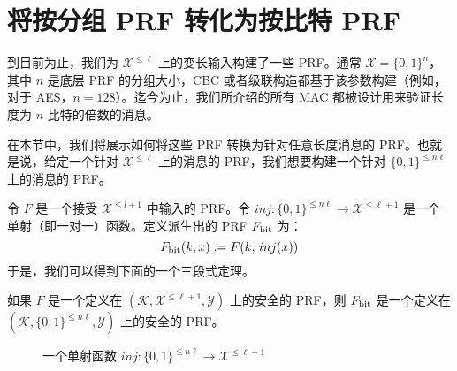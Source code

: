 \section{将按分组 PRF 转化为按比特 PRF}\label{sec:6-8}

到目前为止，我们为 $\mathcal{X}^{\leq\ell}$ 上的变长输入构建了一些 PRF。通常 $\mathcal{X}=\{0,1\}^n$，其中 $n$ 是底层 PRF 的分组大小，CBC 或者级联构造都基于该参数构建（例如，对于 AES，$n=128$）。迄今为止，我们所介绍的所有 MAC 都被设计用来验证长度为 $n$ 比特的倍数的消息。

在本节中，我们将展示如何将这些 PRF 转换为针对任意长度消息的 PRF。也就是说，给定一个针对 $\mathcal{X}^{\leq\ell}$ 上的消息的 PRF，我们想要构建一个针对 $\{0,1\}^{\leq n\ell}$ 上的消息的 PRF。

令 $F$ 是一个接受 $\mathcal{X}^{\leq l+1}$ 中输入的 PRF。令 $inj:\{0,1\}^{\leq n\ell}\to\mathcal{X}^{\leq\ell+1}$ 是一个单射（即一对一）函数。定义派生出的 PRF $F_{\rm bit}$ 为：
\[
F_{\rm bit}(k,x):=F(k,\,inj(x))
\]
于是，我们可以得到下面的一个三段式定理。

\begin{theorem}\label{theo:6-10}
如果 $F$ 是一个定义在 $(\mathcal{K},\mathcal{X}^{\leq\ell+1},\mathcal{Y})$ 上的安全的 PRF，则 $F_{\rm bit}$ 是一个定义在 $(\mathcal{K},\{0,1\}^{\leq n\ell},\mathcal{Y})$ 上的安全的 PRF。
\end{theorem}

\begin{figure}
  \centering
  
  \caption{一个单射函数 $inj:\{0,1\}^{\leq n\ell}\to\mathcal{X}^{\leq\ell+1}$}
  \label{fig:6-7}
\end{figure}

